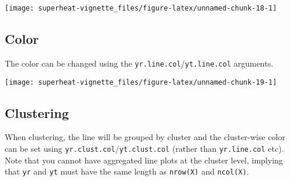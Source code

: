 \documentclass[]{book}
\newenvironment{Shaded}{\begin{snugshade}}{\end{snugshade}}
\newcommand{\KeywordTok}[1]{\textcolor[rgb]{0.13,0.29,0.53}{\textbf{{#1}}}}
\newcommand{\DataTypeTok}[1]{\textcolor[rgb]{0.13,0.29,0.53}{{#1}}}
\newcommand{\DecValTok}[1]{\textcolor[rgb]{0.00,0.00,0.81}{{#1}}}
\newcommand{\FloatTok}[1]{\textcolor[rgb]{0.00,0.00,0.81}{{#1}}}
\newcommand{\StringTok}[1]{\textcolor[rgb]{0.31,0.60,0.02}{{#1}}}
\newcommand{\CommentTok}[1]{\textcolor[rgb]{0.56,0.35,0.01}{\textit{{#1}}}}
\newcommand{\NormalTok}[1]{{#1}}
\theoremstyle{definition}
\theoremstyle{definition}
\theoremstyle{remark}
\begin{document}
\begin{center}\texttt{[image: superheat-vignette\_files/figure-latex/unnamed-chunk-18-1]} \end{center}

\subsection{Color}\label{color-2}

The color can be changed using the
\texttt{yr.line.col}/\texttt{yt.line.col} arguments.

\begin{Shaded}
\end{Shaded}

\begin{center}\texttt{[image: superheat-vignette\_files/figure-latex/unnamed-chunk-19-1]} \end{center}

\subsection{Clustering}\label{clustering-2}

When clustering, the line will be grouped by cluster and the
cluster-wise color can be set using
\texttt{yr.clust.col}/\texttt{yt.clust.col} (rather than
\texttt{yr.line.col} etc). Note that you cannot have aggregated line
plots at the cluster level, implying that \texttt{yr} and \texttt{yt}
must have the same length as \texttt{nrow(X)} and \texttt{ncol(X)}.
\end{document}
